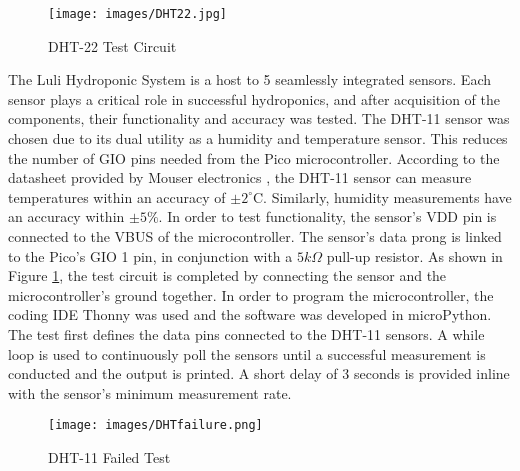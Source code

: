 \documentclass[12pt]{article} %
\begin{document}
\begin{figure}[H]
  \centering
  \texttt{[image: images/DHT22.jpg]}
  \caption{DHT-22 Test Circuit}
  \label{fig:DHT-22 Test Circuit}
\end{figure}

\noindent The Luli Hydroponic System is a host to 5 seamlessly integrated sensors. Each sensor plays a critical role in successful hydroponics, and after acquisition of the components, their functionality and accuracy was tested. The DHT-11 sensor was chosen due to its dual utility as a humidity and temperature sensor. This reduces the number of GIO pins needed from the Pico microcontroller. According to the datasheet provided by Mouser electronics \cite{ref_dht}, the DHT-11 sensor can measure temperatures within an accuracy of $\pm 2^\circ\text{C}$. Similarly, humidity measurements have an accuracy within $\pm 5 \%$. In order to test functionality, the sensor’s VDD pin is connected to the VBUS of the microcontroller. The sensor’s data prong is linked to the Pico’s GIO 1 pin, in conjunction with a $5 k\Omega$ pull-up resistor. As shown in Figure \ref{fig:DHT-22 Test Circuit}, the test circuit is completed by connecting the sensor and the microcontroller’s ground together. In order to program the microcontroller, the coding IDE Thonny was used and the software was developed in microPython. The test first defines the data pins connected to the DHT-11 sensors. A while loop is used to continuously poll the sensors until a successful measurement is conducted and the output is printed. A short delay of 3 seconds is provided inline with the sensor’s minimum measurement rate.

\begin{figure}[H]
  \centering
  \texttt{[image: images/DHTfailure.png]}
  \caption{DHT-11 Failed Test}
  \label{fig:DHT-22 Accuracy test}
\end{figure}
\end{document}

